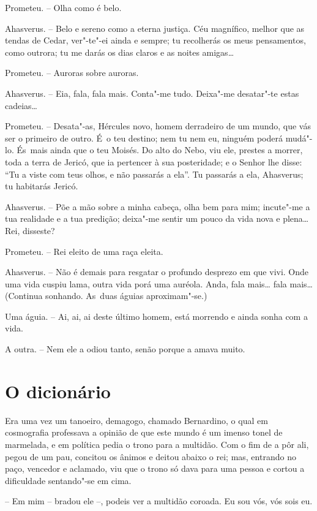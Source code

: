 Prometeu. -- Olha como é belo.

Ahasverus. -- Belo e sereno como a eterna justiça. Céu magnífico, melhor
que as tendas de Cedar, ver"-te"-ei ainda e sempre; tu recolherás os meus
pensamentos, como outrora; tu me darás os dias claros e as noites
amigas\ldots{}

Prometeu. -- Auroras sobre auroras.

Ahasverus. -- Eia, fala, fala mais. Conta"-me tudo. Deixa"-me desatar"-te
estas cadeias\ldots{}

Prometeu. -- Desata"-as, Hércules novo, homem derradeiro de um mundo, que
vás ser o primeiro de outro. É~o teu destino; nem tu nem eu, ninguém
poderá mudá"-lo. És~mais ainda que o teu Moisés. Do alto do Nebo, viu
ele, prestes a morrer, toda a terra de Jericó, que ia pertencer à sua
posteridade; e o Senhor lhe disse: ``Tu a viste com teus olhos, e não
passarás a ela''. Tu passarás a ela, Ahasverus; tu habitarás Jericó.

Ahasverus. -- Põe a mão sobre a minha cabeça, olha bem para mim;
incute"-me a tua realidade e a tua predição; deixa"-me sentir um pouco da
vida nova e plena\ldots{} Rei, disseste?

Prometeu. -- Rei eleito de uma raça eleita.

Ahasverus. -- Não é demais para resgatar o profundo desprezo em que
vivi. Onde uma vida cuspiu lama, outra vida porá uma auréola. Anda, fala
mais\ldots{} fala mais\ldots{} (Continua sonhando. As~duas águias aproximam"-se.)

Uma águia. -- Ai, ai, ai deste último homem, está morrendo e ainda sonha
com a vida.

A outra. -- Nem ele a odiou tanto, senão porque a amava muito.

\chapter{O dicionário}

Era uma vez um tanoeiro, demagogo, chamado Bernardino, o qual em
cosmografia professava a opinião de que este mundo é um imenso tonel de
marmelada, e em política pedia o trono para a multidão. Com o fim de a
pôr ali, pegou de um pau, concitou os ânimos e deitou abaixo o rei; mas,
entrando no paço, vencedor e aclamado, viu que o trono só dava para uma
pessoa e cortou a dificuldade sentando"-se em cima.

-- Em mim -- bradou ele --, podeis ver a multidão coroada. Eu sou vós,
vós sois eu.

